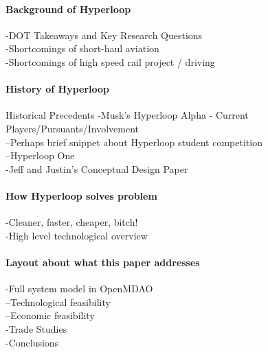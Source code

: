 \paragraph{Background of Hyperloop}
-DOT Takeaways and Key Research Questions\\
-Shortcomings of short-haul aviation\\
-Shortcomings of high speed rail project / driving\\
\paragraph{History of Hyperloop}
Historical Precedents
-Musk’s Hyperloop Alpha - Current Players/Pursuants/Involvement\\
--Perhaps brief snippet about Hyperloop student competition\\
--Hyperloop One\\
-Jeff and Justin’s Conceptual Design Paper\\
\paragraph{How Hyperloop solves problem}
-Cleaner, faster, cheaper, bitch!\\
-High level technological overview\\
\paragraph{Layout about what this paper addresses}
-Full system model in OpenMDAO\\
--Technological feasibility\\
--Economic feasibility\\
-Trade Studies\\
-Conclusions\\
